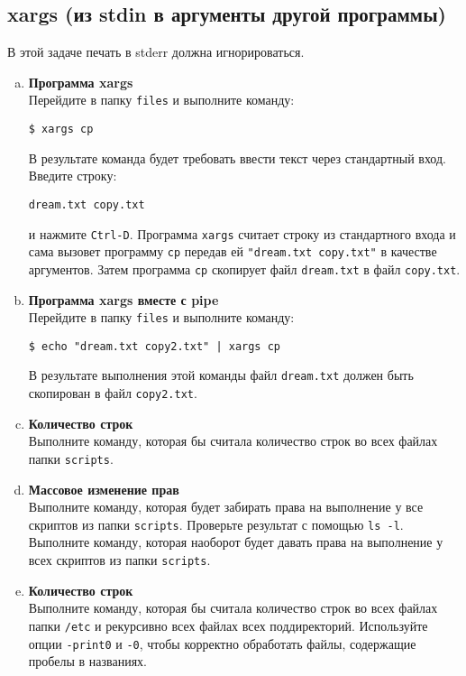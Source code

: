 \documentclass{article}
\begin{document}
\subsection{xargs (из stdin в аргументы другой программы)}
В этой задаче печать в stderr должна игнорироваться.
\begin{enumerate}[a.]
\item \textbf{Программа xargs}\\
Перейдите в папку \texttt{files} и выполните команду:
\begin{lstlisting}
$ xargs cp
\end{lstlisting}
В результате команда будет требовать ввести текст через стандартный вход. Введите строку:
\begin{lstlisting}
dream.txt copy.txt
\end{lstlisting}
и нажмите \texttt{Ctrl-D}. Программа \texttt{xargs} считает строку из стандартного входа и сама вызовет программу \texttt{cp} передав ей \texttt{"dream.txt copy.txt"} в качестве аргументов. Затем программа \texttt{cp} скопирует файл \texttt{dream.txt} в файл \texttt{copy.txt}.

\item \textbf{Программа xargs вместе с pipe}\\
Перейдите в папку \texttt{files} и выполните команду:
\begin{lstlisting}
$ echo "dream.txt copy2.txt" | xargs cp
\end{lstlisting}
В результате выполнения этой команды файл \texttt{dream.txt} должен быть скопирован в файл \texttt{copy2.txt}.

\item \textbf{Количество строк}\\
Выполните команду, которая бы считала количество строк во всех файлах папки \texttt{scripts}.

\item \textbf{Массовое изменение прав}\\
Выполните команду, которая будет забирать права на выполнение у все скриптов из папки \texttt{scripts}. Проверьте результат с помощью \texttt{ls -l}. Выполните команду, которая наоборот будет давать права на выполнение у всех скриптов из папки \texttt{scripts}.

\item \textbf{Количество строк}\\
Выполните команду, которая бы считала количество строк во всех файлах папки \texttt{/etc} и рекурсивно всех файлах всех поддиректорий. Используйте опции \texttt{-print0} и \texttt{-0}, чтобы корректно обработать файлы, содержащие пробелы в названиях. 


\end{enumerate}
\end{document}
